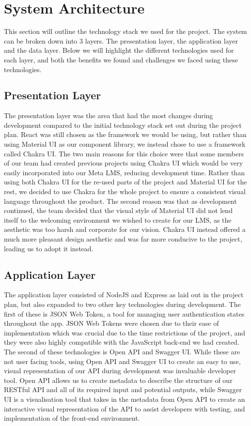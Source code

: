 \section{System Architecture}
This section will outline the technology stack we used for the project. The system can be broken down into 3 layers. The presentation layer, the application layer and the data layer. Below we will highlight the different technologies used for each layer, and both the benefits we found and challenges we faced using these technologies.


\subsection{Presentation Layer}

The presentation layer was the area that had the most changes during development compared to the initial technology stack set out during the project plan. React was still chosen as the framework we would be using, but rather than using Material UI as our component library, we instead chose to use a framework called Chakra UI. The two main reasons for this choice were that some members of our team had created previous projects using Chakra UI which would be very easily incorporated into our Meta LMS, reducing development time. Rather than using both Chakra UI for the re-used parts of the project and Material UI for the rest, we decided to use Chakra for the whole project to ensure a consistent visual language throughout the product. The second reason was that as development continued, the team decided that the visual style of Material UI did not lend itself to the welcoming environment we wished to create for our LMS, as the aesthetic was too harsh and corporate for our vision. Chakra UI instead offered a much more pleasant design aesthetic and was far more conducive to the project, leading us to adopt it instead.

\subsection{Application Layer}

The application layer consisted of NodeJS and Express as laid out in the project plan, but also expanded to two other key technologies during development. The first of these is JSON Web Token, a tool for managing user authentication states throughout the app. JSON Web Tokens were chosen due to their ease of implementation which was crucial due to the time restrictions of the project, and they were also highly compatible with the JavaScript back-end we had created. The second of these technologies is Open API and Swagger UI. While these are not user facing tools, using Open API and Swagger UI to create an easy to use, visual representation of our API during development was invaluable developer tool. Open API allows us to create metadata to describe the structure of our RESTful API and all of its required input and potential outputs, while Swagger UI is a visualisation tool that takes in the metadata from Open API to create an interactive visual representation of the API to assist developers with testing, and implementation of the front-end environment.

